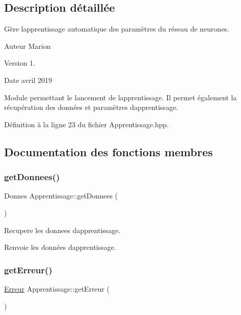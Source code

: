 \subsection{Description détaillée}
Gère l\textquotesingle{}apprentissage automatique des paramètres du réseau de neurones. 

\begin{DoxyAuthor}{Auteur}
Marion 
\end{DoxyAuthor}
\begin{DoxyVersion}{Version}
1. 
\end{DoxyVersion}
\begin{DoxyDate}{Date}
avril 2019
\end{DoxyDate}
Module permettant le lancement de l\textquotesingle{}apprentissage. Il permet également la récupération des données et paramètres d\textquotesingle{}apprentissage. 

Définition à la ligne 23 du fichier Apprentissage.\+hpp.



\subsection{Documentation des fonctions membres}
\mbox{\label{class_apprentissage_ac9fbf481a1bc46c15a36129c1eba3796}} 
\subsubsection{\texorpdfstring{get\+Donnees()}{getDonnees()}}
{\footnotesize\ttfamily Donnes Apprentissage\+::get\+Donnees (\begin{DoxyParamCaption}{ }\end{DoxyParamCaption})}



Recupere les donnees d\textquotesingle{}apprentissage. 

\begin{DoxyReturn}{Renvoie}
les données d\textquotesingle{}apprentissage. 
\end{DoxyReturn}
\mbox{\label{class_apprentissage_a9df18f6e95729c7263a2ab1fa9a0df8f}} 
\subsubsection{\texorpdfstring{get\+Erreur()}{getErreur()}}
{\footnotesize\ttfamily \hyperlink{class_erreur}{Erreur} Apprentissage\+::get\+Erreur (\begin{DoxyParamCaption}{ }\end{DoxyParamCaption})}



